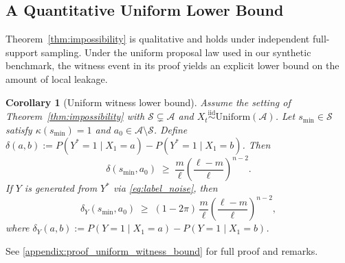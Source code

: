 \documentclass[fullpaper]{nldl}
\theoremstyle{plain}
\newtheorem{corollary}[theorem]{Corollary}
\theoremstyle{definition}
\theoremstyle{remark}
\begin{document}
\subsection{A Quantitative Uniform Lower Bound}
\label{sec:uniform_witness_bound}

Theorem~\ref{thm:impossibility} is qualitative and holds under independent full-support sampling. Under the uniform proposal law used in our synthetic benchmark, the witness event in its proof yields an explicit lower bound on the amount of local leakage.

\begin{corollary}[Uniform witness lower bound]
\label{cor:uniform_witness_bound}
Assume the setting of Theorem~\ref{thm:impossibility} with
$\mathcal{S}\subsetneq\mathcal{A}$ and
$X_t \overset{\mathrm{iid}}{\sim} \mathrm{Uniform}(\mathcal{A})$.
Let $s_{\min}\in\mathcal{S}$ satisfy $\kappa(s_{\min})=1$ and
$a_0\in\mathcal{A}\setminus\mathcal{S}$. Define
$\delta(a,b) := P(Y^*\!=\!1\mid X_1\!=\!a)
              - P(Y^*\!=\!1\mid X_1\!=\!b)$.
Then
\begin{equation}
\label{eq:witness_clean}
\delta(s_{\min},a_0)
\;\ge\;
\frac{m}{\ell}
\!\left(\frac{\ell-m}{\ell}\right)^{\!n-2}.
\end{equation}
If $Y$ is generated from $Y^*$ via \eqref{eq:label_noise}, then
\begin{equation}
\label{eq:witness_noisy}
\delta_Y(s_{\min},a_0)
\;\ge\;
(1-2\pi)\,\frac{m}{\ell}
\!\left(\frac{\ell-m}{\ell}\right)^{\!n-2},
\end{equation}
where
$\delta_Y(a,b) := P(Y\!=\!1\mid X_1\!=\!a)
                 - P(Y\!=\!1\mid X_1\!=\!b)$.
\end{corollary}

See \ref{appendix:proof_uniform_witness_bound} for full proof and remarks.
\end{document}
